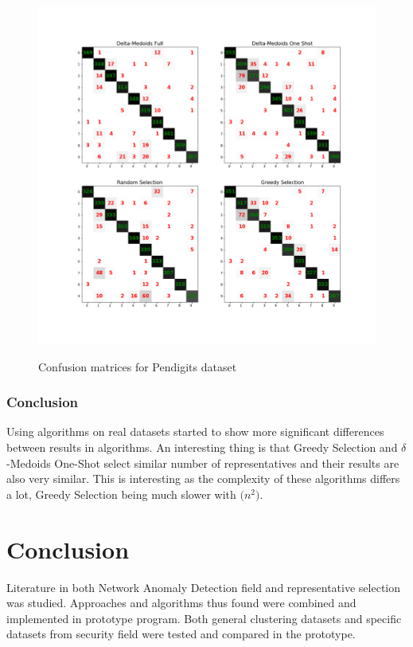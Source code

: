 \documentclass[thesis=B,english]{FITthesis}[2012/10/20]
\begin{document}
\begin{figure}
   \includegraphics[width=\linewidth]{img/exp3_pendigits.png}
  \label{img:exp3_pendigits}
  \caption{Confusion matrices for Pendigits dataset}
\end{figure}

\subsection{Conclusion}
Using algorithms on real datasets started to show more significant differences between results in algorithms.
An interesting thing is that Greedy Selection and $\delta$-Medoids One-Shot select similar number of representatives and their results are also very similar.
This is interesting as the complexity of these algorithms differs a lot, Greedy Selection being much slower with $\mathcal(n^2)$. 




\chapter{Conclusion}
Literature in both Network Anomaly Detection field and representative selection was studied.
Approaches and algorithms thus found were combined and implemented in prototype program.
Both general clustering datasets and specific datasets from security field were tested and compared in the prototype. \\
\end{document}
